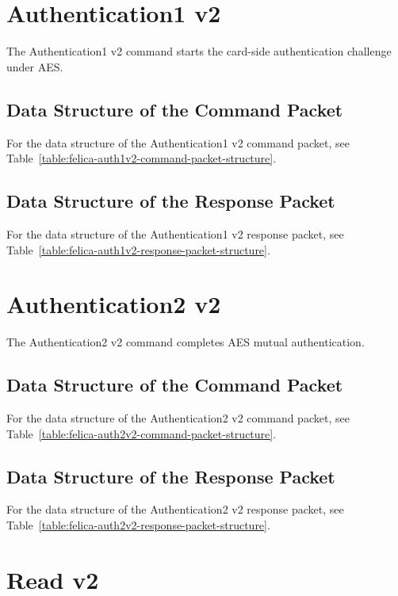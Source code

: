 \documentclass[a4paper,11pt]{report}
\begin{document}
\section{Authentication1 v2}

The Authentication1 v2 command starts the card-side authentication challenge under AES.

\subsection{Data Structure of the Command Packet}

For the data structure of the Authentication1 v2 command packet, see Table~\ref{table:felica-auth1v2-command-packet-structure}.

\subsection{Data Structure of the Response Packet}

For the data structure of the Authentication1 v2 response packet, see Table~\ref{table:felica-auth1v2-response-packet-structure}.

\section{Authentication2 v2}

The Authentication2 v2 command completes AES mutual authentication.

\subsection{Data Structure of the Command Packet}

For the data structure of the Authentication2 v2 command packet, see Table~\ref{table:felica-auth2v2-command-packet-structure}.

\subsection{Data Structure of the Response Packet}

For the data structure of the Authentication2 v2 response packet, see Table~\ref{table:felica-auth2v2-response-packet-structure}.

\section{Read v2}
\end{document}
